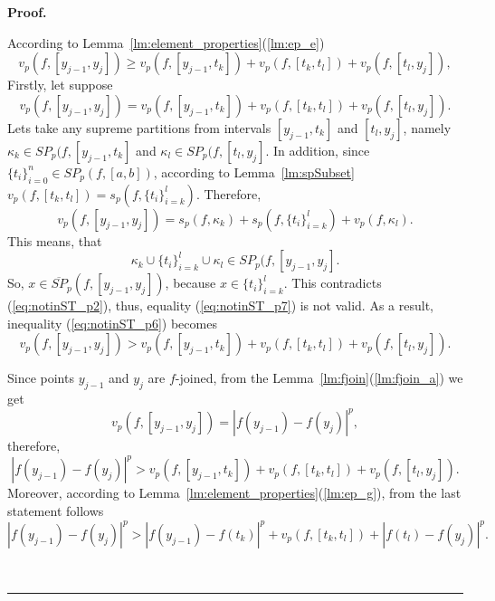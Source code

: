 \documentclass[12pt, a4paper]{article}
\newenvironment{proof}[1][Proof]{\noindent \textbf{#1.} }{\  \rule{0.5em}{0.5em}}
\numberwithin{equation}{section}
\begin{document}
\begin{proof}
 
  According to Lemma~\ref{lm:element_properties}(\ref{lm:ep_e})
  \begin{equation}\label{eq:notinST_p6}
    v_p(f,[y_{j-1},y_j]) \geq v_p(f,[y_{j-1},t_{k}]) 
      + v_p(f,[t_{k},t_{l}]) + v_p(f,[t_{l},y_j]),
  \end{equation}      
  Firstly, let suppose   
  \begin{equation}\label{eq:notinST_p7}
    v_p(f,[y_{j-1},y_j]) = v_p(f,[y_{j-1},t_{k}]) 
      + v_p(f,[t_{k},t_{l}]) + v_p(f,[t_{l},y_j]).
  \end{equation}   
  Lets take any supreme partitions from intervals
  $[y_{j-1},t_{k}]$ and  $[t_{l},y_j]$, namely
  $\kappa_k \in SP_p(f,[y_{j-1},t_{k}]$ and
  $\kappa_l \in SP_p(f,[t_{l},y_j]$.  
  In addition, since $\{t_i\}_{i=0}^n \in SP_p(f, [a, b])$,
  according to Lemma~\ref{lm:spSubset}
  $v_p(f,[t_{k},t_{l}]) = s_p(f,\{t_i\}_{i=k}^l)$.
  Therefore,
  \begin{equation*}\label{eq:notinST_p8}
    v_p(f,[y_{j-1},y_j]) = s_p(f,\kappa_k) 
      + s_p(f,\{t_i\}_{i=k}^l) + v_p(f,\kappa_l).
  \end{equation*}  
  This means, that 
  \begin{equation*}\label{eq:notinST_p9}
    \kappa_k \cup \{t_i\}_{i=k}^l \cup \kappa_l 
      \in SP_p(f, [y_{j-1}, y_j].
  \end{equation*} 
  So, 
  $x \in \overline{SP}_p(f, [y_{j-1}, y_j])$, 
  because $x \in \{t_i\}_{i=k}^l$.
  This contradicts (\ref{eq:notinST_p2}),
  thus, equality (\ref{eq:notinST_p7}) is not valid.
  As a result, inequality (\ref{eq:notinST_p6}) becomes
  \begin{equation}\label{eq:notinST_p10}
    v_p(f,[y_{j-1},y_j]) > v_p(f,[y_{j-1},t_{k}]) 
      + v_p(f,[t_{k},t_{l}]) + v_p(f,[t_{l},y_j]).
  \end{equation}    
  
  Since points $y_{j-1}$ and $y_j$ are $f$-joined,
  from the Lemma~\ref{lm:fjoin}(\ref{lm:fjoin_a}) we get
  \begin{equation*}\label{eq:notinST_p11}
    v_p(f,[y_{j-1},y_j]) = |f(y_{j-1})-f(y_j)|^p,
  \end{equation*}   
  therefore,
  \begin{equation*}\label{eq:notinST_p12}
    |f(y_{j-1})-f(y_j)|^p > v_p(f,[y_{j-1},t_{k}]) 
      + v_p(f,[t_{k},t_{l}]) + v_p(f,[t_{l},y_j]). 
  \end{equation*}        
  Moreover, according to 
  Lemma~\ref{lm:element_properties}(\ref{lm:ep_g}), 
  from the last statement follows
  \begin{equation} \label{eq:notinST_p13}
    |f(y_{j-1})-f(y_j)|^p > |f(y_{j-1})-f(t_{k})|^p +
       v_p(f,[t_k,t_l]) +  |f(t_{l})-f(y_j)|^p.   
  \end{equation}  
  

\end{proof}
\end{document}
